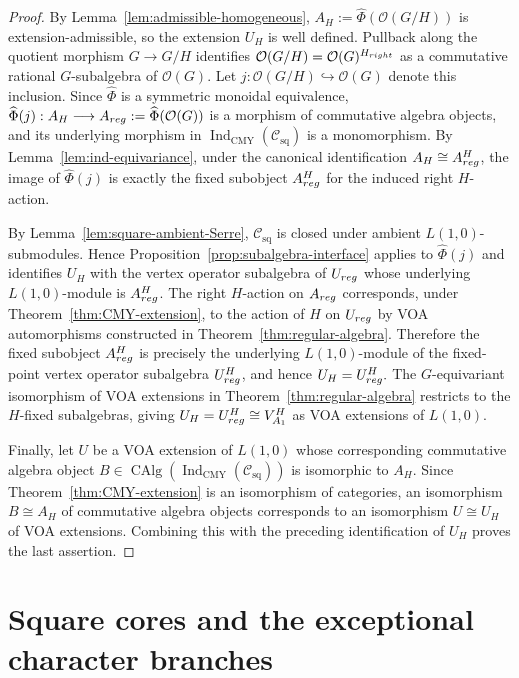 \documentclass[10pt,a4paper]{amsart}
\numberwithin{equation}{section} \newtheorem{thm}{Theorem}[section] \newtheorem{lem}[thm]{Lemma} \newtheorem{ex}[thm]{Example} \newtheorem{prop}[thm]{Proposition} \newtheorem{cor}[thm]{Corollary} \newtheorem{defi}[thm]{Definition} \newtheorem{rmk}[thm]{Remark} \newtheorem{notation}[thm]{Notation}
\newcommand{\OO}{\mathcal O}
\newcommand{\Csq}{\mathcal C_{\mathrm{sq}}}
\newcommand{\CAlg}{\operatorname{CAlg}}
\newcommand{\IndCMY}{\operatorname{Ind}_{\mathrm{CMY}}}
\begin{document}
\begin{proof}
By Lemma~\ref{lem:admissible-homogeneous}, \(A_H:=\widehat\Phi(\OO(G/H))\) is extension-admissible, so the extension $U_H$ is well defined. Pullback along the quotient morphism $G\to G/H$ identifies \(\OO(G/H)=\OO(G)^{H_{\rm right}}\) as a commutative rational $G$-subalgebra of $\OO(G)$. Let \(j:\OO(G/H)\hookrightarrow\OO(G)\) denote this inclusion. Since $\widehat\Phi$ is a symmetric monoidal equivalence, \(\widehat\Phi(j):A_H\longrightarrow A_{\rm reg}:=\widehat\Phi(\OO(G))\) is a morphism of commutative algebra objects, and its underlying morphism in $\IndCMY(\Csq)$ is a monomorphism. By Lemma~\ref{lem:ind-equivariance}, under the canonical identification \(A_H\cong A_{\rm reg}^{H}\), the image of $\widehat\Phi(j)$ is exactly the fixed subobject $A_{\rm reg}^{H}$ for the induced right $H$-action.

By Lemma~\ref{lem:square-ambient-Serre}, $\Csq$ is closed under ambient $L(1,0)$-submodules. Hence Proposition~\ref{prop:subalgebra-interface} applies to $\widehat\Phi(j)$ and identifies $U_H$ with the vertex operator subalgebra of $U_{\rm reg}$ whose underlying $L(1,0)$-module is $A_{\rm reg}^{H}$. The right $H$-action on $A_{\rm reg}$ corresponds, under Theorem~\ref{thm:CMY-extension}, to the action of $H$ on $U_{\rm reg}$ by VOA automorphisms constructed in Theorem~\ref{thm:regular-algebra}. Therefore the fixed subobject $A_{\rm reg}^{H}$ is precisely the underlying $L(1,0)$-module of the fixed-point vertex operator subalgebra $U_{\rm reg}^{H}$, and hence \(U_H=U_{\rm reg}^{H}.\) The $G$-equivariant isomorphism of VOA extensions in Theorem~\ref{thm:regular-algebra} restricts to the $H$-fixed subalgebras, giving \(U_H=U_{\rm reg}^{H}\cong V_{A_1}^{H}\) as VOA extensions of $L(1,0)$.

Finally, let $U$ be a VOA extension of $L(1,0)$ whose corresponding commutative algebra object $B\in\CAlg(\IndCMY(\Csq))$ is isomorphic to $A_H$. Since Theorem~\ref{thm:CMY-extension} is an isomorphism of categories, an isomorphism $B\cong A_H$ of commutative algebra objects corresponds to an isomorphism $U\cong U_H$ of VOA extensions. Combining this with the preceding identification of $U_H$ proves the last assertion.
\end{proof}

\section{Square cores and the exceptional character branches}\label{sec:squarecore}
\end{document}
